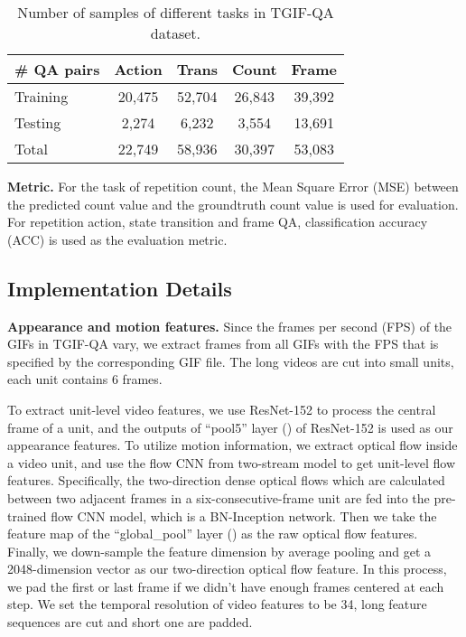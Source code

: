 \documentclass[10pt,twocolumn,letterpaper]{article}
\begin{document}
\begin{table}[]
\centering
\caption{Number of samples of different tasks in TGIF-QA dataset.}
\vspace{5pt}
\label{tbl:dataset}
\begin{tabular}{l|cccc}
\hline
\# QA pairs     & Action    & Trans     & Count     & Frame     \\ \hline
Training        & 20,475    & 52,704    & 26,843    & 39,392    \\ \hline
Testing         & 2,274     & 6,232     & 3,554     & 13,691    \\ \hline
Total           & 22,749    & 58,936    & 30,397    & 53,083    \\ \hline
\end{tabular}
\end{table}

\textbf{Metric.} For the task of repetition count, the Mean Square Error (MSE) between the predicted count value and the groundtruth count value is used for evaluation. For repetition action, state transition and frame QA, classification accuracy (ACC) is used as the evaluation metric.

\subsection{Implementation Details}
\textbf{Appearance and motion features.} Since the frames per second (FPS) of the GIFs in TGIF-QA \cite{Jang_2017_CVPR} vary, we extract frames from all GIFs with the FPS that is specified by the corresponding GIF file. The long videos are cut into small units, each unit contains 6 frames.

To extract unit-level video features, we use ResNet-152 \cite{He_2016_CVPR_resnet}  to process the central frame of a unit, and the outputs of ``pool5'' layer () of ResNet-152 is used as our appearance features. To utilize motion information, we extract optical flow inside a video unit, and use the flow CNN from two-stream model \cite{xiong2016cuhk} to get unit-level flow features. Specifically, the two-direction dense optical flows \cite{farneback2003two} which are calculated between two adjacent frames in a six-consecutive-frame unit are fed into the pre-trained flow CNN model, which is a BN-Inception network\cite{ioffe2015batch}. Then we take the feature map of the ``global\_pool'' layer () as the raw optical flow features. Finally, we down-sample the feature dimension by average pooling and get a 2048-dimension vector as our two-direction optical flow feature. In this process, we pad the first or last frame if we didn't have enough frames centered at each step. We set the temporal resolution of video features to be 34, long feature sequences are cut and short one are padded.
\end{document}
